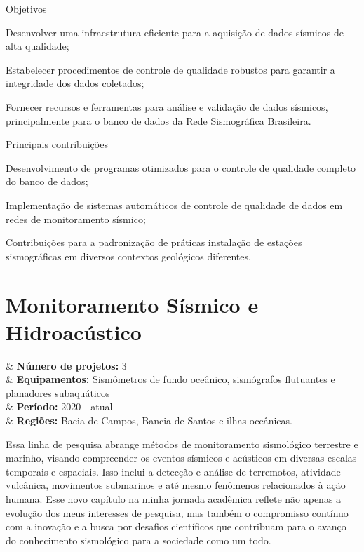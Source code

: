 \documentclass[10pt,a4paper,oneside]{book}
\begin{document}
\begin{fancyenum}{\faFutbol}{Objetivos}
  \item Desenvolver uma infraestrutura eficiente para a aquisição de dados sísmicos de alta qualidade;
  \item Estabelecer procedimentos de controle de qualidade robustos para garantir a integridade dos dados coletados;
  \item Fornecer recursos e ferramentas para análise e validação de dados sísmicos, principalmente para o banco de dados da Rede Sismográfica Brasileira.
\end{fancyenum}

\begin{fancyenum}{\faCogs}{Principais contribuições}
  \item Desenvolvimento de programas otimizados para o controle de qualidade completo do banco de dados;
  \item Implementação de sistemas automáticos de controle de qualidade de dados em redes de monitoramento sísmico;
  \item Contribuições para a padronização de práticas instalação de estações sismográficas em diversos contextos geológicos diferentes.
\end{fancyenum}

\section{Monitoramento Sísmico e Hidroacústico}
\label{sec_monitor_sis}

\begin{summarybox}[frametitle=\faProjectDiagram{}\quad Panorama da linha de pesquisa]
	\begin{datelist}
		\faFile* & \textbf{Número de projetos:} 3 \\
		\faBinoculars & \textbf{Equipamentos:} Sismômetros de fundo oceânico, sismógrafos flutuantes e planadores subaquáticos \\
		\faCalendar*[regular] & \textbf{Período:} 2020 - atual \\
		\faMapMarked* & \textbf{Regiões:} Bacia de Campos, Bancia de Santos e ilhas oceânicas. \\
	\end{datelist}
\end{summarybox}

\bigskip

Essa linha de pesquisa abrange métodos de monitoramento sismológico terrestre e marinho, visando compreender os eventos sísmicos e acústicos em diversas escalas temporais e espaciais. Isso inclui a detecção e análise de terremotos, atividade vulcânica, movimentos submarinos e até mesmo fenômenos relacionados à ação humana. Esse novo capítulo na minha jornada acadêmica reflete não apenas a evolução dos meus interesses de pesquisa, mas também o compromisso contínuo com a inovação e a busca por desafios científicos que contribuam para o avanço do conhecimento sismológico para a sociedade como um todo.
\end{document}
